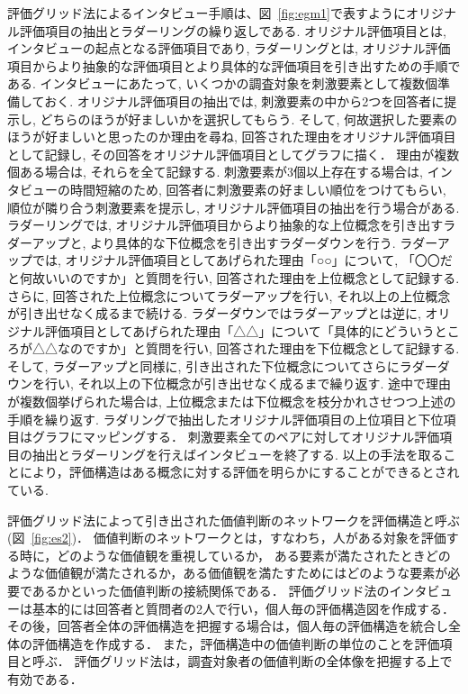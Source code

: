 \documentclass[syuuron]{kuee}
\begin{document}
		評価グリッド法によるインタビュー手順は、図~\ref{fig:egm1}で表すようにオリジナル評価項目の抽出とラダーリングの繰り返しである. 
		オリジナル評価項目とは, インタビューの起点となる評価項目であり, 
		ラダーリングとは, オリジナル評価項目からより抽象的な評価項目とより具体的な評価項目を引き出すための手順である. 
		インタビューにあたって, いくつかの調査対象を刺激要素として複数個準備しておく. 
		オリジナル評価項目の抽出では, 刺激要素の中から2つを回答者に提示し, どちらのほうが好ましいかを選択してもらう. 
		そして, 何故選択した要素のほうが好ましいと思ったのか理由を尋ね, 回答された理由をオリジナル評価項目として記録し, その回答をオリジナル評価項目としてグラフに描く．
		理由が複数個ある場合は, それらを全て記録する. 
		刺激要素が3個以上存在する場合は, インタビューの時間短縮のため, 回答者に刺激要素の好ましい順位をつけてもらい, 順位が隣り合う刺激要素を提示し, 
		オリジナル評価項目の抽出を行う場合がある. 
		ラダーリングでは, オリジナル評価項目からより抽象的な上位概念を引き出すラダーアップと, より具体的な下位概念を引き出すラダーダウンを行う. 
		ラダーアップでは, オリジナル評価項目としてあげられた理由「○○」について, 「〇〇だと何故いいのですか」と質問を行い, 回答された理由を上位概念として記録する. 
		さらに, 回答された上位概念についてラダーアップを行い, それ以上の上位概念が引き出せなく成るまで続ける. 
		ラダーダウンではラダーアップとは逆に, オリジナル評価項目としてあげられた理由「△△」について「具体的にどういうところが△△なのですか」と質問を行い, 
		回答された理由を下位概念として記録する. 
		そして, ラダーアップと同様に, 引き出された下位概念についてさらにラダーダウンを行い, それ以上の下位概念が引き出せなく成るまで繰り返す. 
		途中で理由が複数個挙げられた場合は, 上位概念または下位概念を枝分かれさせつつ上述の手順を繰り返す. 
		ラダリングで抽出したオリジナル評価項目の上位項目と下位項目はグラフにマッピングする．
		刺激要素全てのペアに対してオリジナル評価項目の抽出とラダーリングを行えばインタビューを終了する. 
		以上の手法を取ることにより，評価構造はある概念に対する評価を明らかにすることができるとされている. 
		
		評価グリッド法によって引き出された価値判断のネットワークを評価構造と呼ぶ(図~\ref{fig:es2})．
		価値判断のネットワークとは，すなわち，人がある対象を評価する時に，どのような価値観を重視しているか，
		ある要素が満たされたときどのような価値観が満たされるか，ある価値観を満たすためにはどのような要素が必要であるかといった価値判断の接続関係である．
		評価グリッド法のインタビューは基本的には回答者と質問者の2人で行い，個人毎の評価構造図を作成する．
		その後，回答者全体の評価構造を把握する場合は，個人毎の評価構造を統合し全体の評価構造を作成する．
		また，評価構造中の価値判断の単位のことを評価項目と呼ぶ．
		評価グリッド法は，調査対象者の価値判断の全体像を把握する上で有効である．
		
\end{document}
